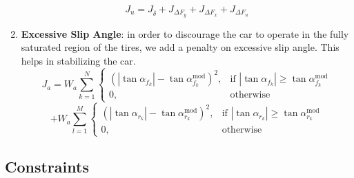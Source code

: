 \documentclass[a4paper, onecolumn, 12pt]{article}
\begin{document}
\begin{enumerate}
    \begin{equation}
        J_{\dot{u}} = J_{\dot{\delta}} + J_{\Delta F_y} + J_{\Delta F_x} + J_{\Delta F_u}
    \end{equation}

    \item \textbf{Excessive Slip Angle}: in order to discourage the car to operate in the fully saturated region of the tires, we add a penalty on excessive slip angle. This helps in stabilizing the car.
    \begin{equation}
        J_{a} = W_{a}\sum_{k=1}^{N}
        \begin{cases}
        \left(|\tan \alpha_{f_k}|-\tan \alpha_{f_k}^{\text{mod}}\right)^2, & \text{if } |\tan \alpha_{f_k}| \geq  \tan \alpha_{f_k}^{\text{mod}}\\
        0, & \text{otherwise}
        \end{cases}
        \end{equation}
        \[  + W_{a}\sum_{l=1}^{M} 
        \begin{cases}
        \left(|\tan \alpha_{r_k}|-\tan \alpha_{r_k}^{\text{mod}}\right)^2, & \text{if } |\tan \alpha_{r_k}| \geq  \tan \alpha_{r_k}^{\text{mod}}\\
        0, & \text{otherwise}
        \end{cases}
        \]
\end{enumerate}

\subsection{Constraints}
\end{document}
